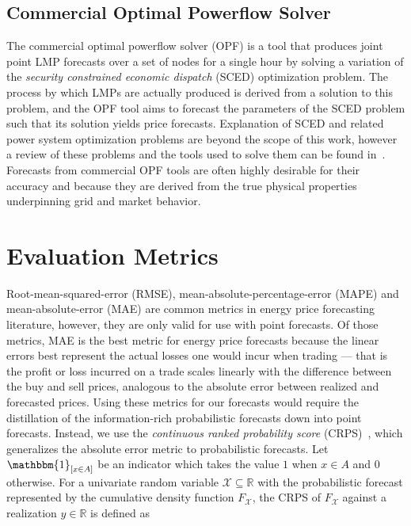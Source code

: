 \subsection{Commercial Optimal Powerflow Solver}\label{subsec:commercial-optimal-powerflow-solver}

The commercial optimal powerflow solver (OPF) is a tool that produces joint point LMP forecasts over a set of nodes
for a single hour by solving a variation of the \textit{security constrained economic dispatch} (SCED) optimization problem.
The process by which LMPs are actually produced is derived from a solution to this problem, and the OPF tool
aims to forecast the parameters of the SCED problem such that its solution yields price forecasts.
Explanation of SCED and related power system optimization problems are beyond the scope of this work, however a review
of these problems and the tools used to solve them can be found in~\cite{opf_textbook}.
Forecasts from commercial OPF tools are often highly desirable for their accuracy and because they are derived from the
true physical properties underpinning grid and market behavior.

\section{Evaluation Metrics}\label{sec:evaluation-metrics}

Root-mean-squared-error (RMSE), mean-absolute-percentage-error (MAPE) and mean-absolute-error (MAE) are common metrics
in energy price forecasting literature, however, they are only valid for use with point forecasts.
Of those metrics, MAE is the best metric for energy price forecasts because the linear errors best
represent the actual losses one would incur when trading --- that is the profit or loss incurred on a trade scales
linearly with the difference between the buy and sell prices, analogous to the absolute error between realized and
forecasted prices.
Using these metrics for our forecasts would require the distillation of the information-rich probabilistic forecasts
down into point forecasts.
Instead, we use the \textit{continuous ranked probability score} (CRPS)~\cite{crps_rules}, which generalizes the absolute error
metric to probabilistic forecasts.
Let $\mathbbm{1}_{\left[x \in A\right]}$ be an indicator which takes the value $1$ when $x \in A$ and $0$ otherwise.
For a univariate random variable $\mathcal{X} \subseteq \mathbb{R}$ with the probabilistic forecast represented by the
cumulative density function $F_\mathcal{X}$, the CRPS of $F_\mathcal{X}$ against a realization $y \in \mathbb{R}$ is defined
as

